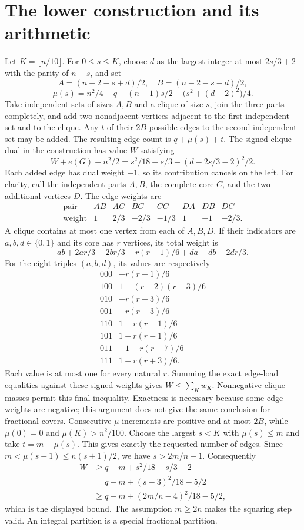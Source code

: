 \documentclass[11pt]{article}
\begin{document}
\section{The lower construction and its arithmetic}
Let $K=\lfloor n/10\rfloor$. For $0\leq s\leq K$, choose $d$ as the largest integer at most $2s/3+2$ with the parity of $n-s$, and set
\[
 A=(n-2-s+d)/2,\quad B=(n-2-s-d)/2,
\]
\[
 \mu(s)=n^2/4-q+(n-1)s/2-\bigl(s^2+(d-2)^2\bigr)/4.
\]
Take independent sets of sizes $A,B$ and a clique of size $s$, join the three parts completely, and add two nonadjacent vertices adjacent to the first independent set and to the clique. Any $t$ of their $2B$ possible edges to the second independent set may be added. The resulting edge count is $q+\mu(s)+t$.
The signed clique dual in the construction has value $W$ satisfying
\[
 W+e(G)-n^2/2=s^2/18-s/3-(d-2s/3-2)^2/2.
\]
Each added edge has dual weight $-1$, so its contribution cancels on the left. For clarity, call the independent parts $A,B$, the complete core $C$, and the two additional vertices $D$. The edge weights are
\[
\begin{array}{c|rrrrrrr}
\text{pair}&AB&AC&BC&CC&DA&DB&DC\\\hline
\text{weight}&1&2/3&-2/3&-1/3&1&-1&-2/3.
\end{array}
\]
A clique contains at most one vertex from each of $A,B,D$. If their indicators are $a,b,d\in\{0,1\}$ and its core has $r$ vertices, its total weight is
\[
ab+2ar/3-2br/3-r(r-1)/6+da-db-2dr/3.
\]
For the eight triples $(a,b,d)$, its values are respectively
\[
\begin{array}{c|l}
000&-r(r-1)/6\\
100&1-(r-2)(r-3)/6\\
010&-r(r+3)/6\\
001&-r(r+3)/6\\
110&1-r(r-1)/6\\
101&1-r(r-1)/6\\
011&-1-r(r+7)/6\\
111&1-r(r+3)/6.
\end{array}
\]
Each value is at most one for every natural $r$. Summing the exact edge-load equalities against these signed weights gives $W\leq\sum_K w_K$. Nonnegative clique masses permit this final inequality. Exactness is necessary because some edge weights are negative; this argument does not give the same conclusion for fractional covers.
Consecutive $\mu$ increments are positive and at most $2B$, while $\mu(0)=0$ and $\mu(K)>n^2/100$. Choose the largest $s<K$ with $\mu(s)\leq m$ and take $t=m-\mu(s)$. This gives exactly the requested number of edges. Since $m<\mu(s+1)\leq n(s+1)/2$, we have $s>2m/n-1$. Consequently
\begin{align*}
 W&\geq q-m+s^2/18-s/3-2\\
  &=q-m+(s-3)^2/18-5/2\\
  &\geq q-m+(2m/n-4)^2/18-5/2,
\end{align*}
which is the displayed bound. The assumption $m\geq2n$ makes the squaring step valid. An integral partition is a special fractional partition.
\end{document}
